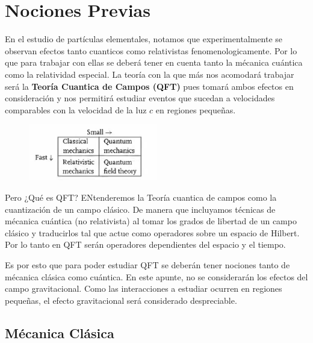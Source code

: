 \documentclass[../main.tex]{subfiles}
\begin{document}
\vspace{3cm}
\chapter{Nociones Previas}

En el estudio de partículas elementales, notamos que experimentalmente se observan efectos tanto cuanticos como relativistas fenomenologicamente. Por lo que para trabajar con ellas se deberá tener en cuenta tanto la mécanica cuántica como la relatividad especial. La teoría con la que más nos acomodará trabajar será la \textbf{Teoría Cuantica de Campos (QFT)} pues tomará ambos efectos en consideración y nos permitirá estudiar eventos que sucedan a velocidades comparables con la velocidad de la luz $c$ en regiones pequeñas.\\

\begin{figure}[h] %
    \centering
    \includegraphics[width=0.5\textwidth]{img/Captura de pantalla 2025-03-29 000744.png}
    \label{fig:graf_QFT}
\end{figure}

Pero ¿Qué es QFT? ENtenderemos la Teoría cuantica de campos como la cuantización de un campo clásico. De manera que incluyamos técnicas de mécanica cuántica (no relativista) al tomar los grados de libertad de un campo clásico y traducirlos tal que actue como operadores sobre un espacio de Hilbert. Por lo tanto en QFT serán operadores dependientes del espacio y el tiempo. 

Es por esto que para poder estudiar QFT se deberán tener nociones tanto de mécanica clásica como cuántica. En este apunte, no se considerarán los efectos del campo gravitacional. Como las interacciones a estudiar ocurren en regiones pequeñas, el efecto gravitacional será considerado despreciable. 


\section{Mécanica Clásica}
\end{document}
